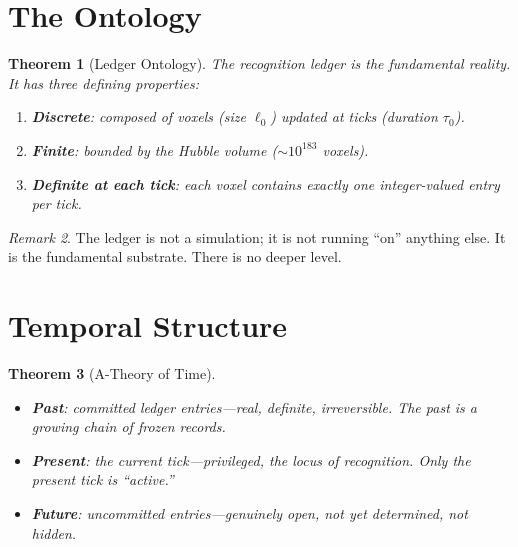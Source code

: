 \documentclass[12pt,a4paper]{article}
\newtheorem{theorem}{Theorem}[section]
\theoremstyle{definition}
\theoremstyle{remark}
\newtheorem{remark}[theorem]{Remark}
\begin{document}
\section{The Ontology}
\label{sec:ontology}

\begin{theorem}[Ledger Ontology]
\label{thm:ontology}
The recognition ledger is the fundamental reality.  It has three
defining properties:
\begin{enumerate}[label=(\roman*)]
  \item \textbf{Discrete}: composed of voxels (size $\ell_0$)
  updated at ticks (duration $\tau_0$).
  \item \textbf{Finite}: bounded by the Hubble volume
  ($\sim 10^{183}$ voxels).
  \item \textbf{Definite at each tick}: each voxel contains
  exactly one integer-valued entry per tick.
\end{enumerate}
\end{theorem}

\begin{remark}
The ledger is not a simulation; it is not running ``on'' anything
else.  It is the fundamental substrate.  There is no deeper level.
\end{remark}

\section{Temporal Structure}
\label{sec:time}

\begin{theorem}[A-Theory of Time]
\label{thm:time}
\begin{itemize}
  \item \textbf{Past}: committed ledger entries---real, definite,
  irreversible.  The past is a growing chain of frozen records.
  \item \textbf{Present}: the current tick---privileged, the
  locus of recognition.  Only the present tick is ``active.''
  \item \textbf{Future}: uncommitted entries---genuinely open,
  not yet determined, not hidden.
\end{itemize}
\end{theorem}
\end{document}
